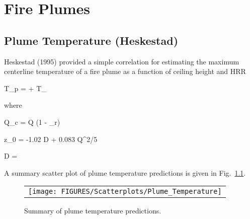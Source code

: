 \chapter{Fire Plumes}

\section{Plume Temperature (Heskestad)}

Heskestad (1995) provided a simple correlation for estimating the maximum centerline temperature of a fire plume as a function of ceiling height and HRR

\be
T_p =  + T_\infty
\ee

\noindent where

\be
\dot Q_c = \dot Q (1 - \chi_r)
\ee

\be
z_0 = -1.02 D + 0.083 \dot Q^{2/5}
\ee

\be
D = 
\ee

\clearpage

A summary scatter plot of plume temperature predictions is given in Fig.~\ref{plume_temperature_summary}. 

\begin{figure}[ht]
\begin{center}
\begin{tabular}{l}
\texttt{[image: FIGURES/Scatterplots/Plume\_Temperature]}
\end{tabular}
\end{center}
\caption[Summary of plume temperature predictions.]
{Summary of plume temperature predictions.}
\label{plume_temperature_summary}
\end{figure}


